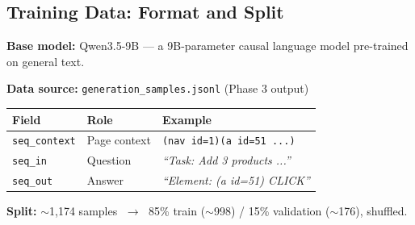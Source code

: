 \subsection{Training Data: Format and Split}
\begin{frame}{\insertsubsection}
  \textbf{Base model:} Qwen3.5-9B --- a 9B-parameter causal language
  model pre-trained on general text.

  \vspace{0.15cm}
  \textbf{Data source:} \texttt{generation\_samples.jsonl} (Phase 3 output)

  \vspace{0.1cm}
  \footnotesize
  \setlength{\tabcolsep}{4pt}
  \begin{tabular}{p{} p{} p{}}
    \textbf{Field}        & \textbf{Role}  & \textbf{Example}                     \\
    \hline
    \texttt{seq\_context} & Page context   & \texttt{(nav id=1)(a id=51 ...)}     \\
    \texttt{seq\_in}      & Question       & \textit{``Task: Add 3 products ...''} \\
    \texttt{seq\_out}     & Answer         & \textit{``Element: (a id=51) CLICK''} \\
  \end{tabular}
  \normalsize

  \vspace{0.15cm}
  \normalsize
  \textbf{Split:} $\sim$1,174 samples $\;\rightarrow\;$
  85\% train ($\sim$998) / 15\% validation ($\sim$176), shuffled.
\end{frame}

